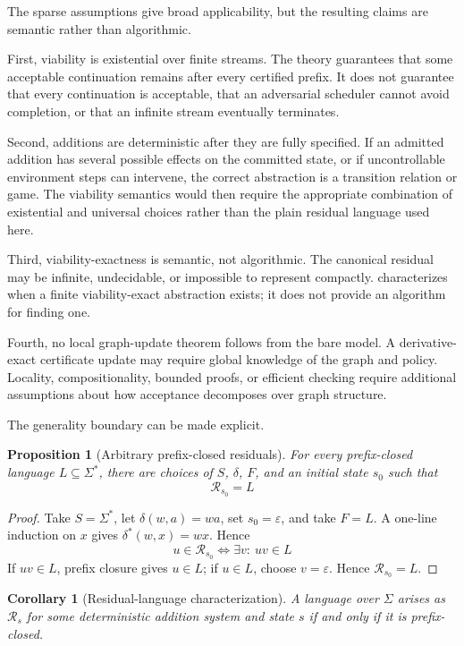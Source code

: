 \documentclass[11pt]{article}
\newtheorem{proposition}[proposition]{Proposition}
\newtheorem{corollary}[corollary]{Corollary}
\theoremstyle{definition}
\newcommand{\States}{S}
\newcommand{\Additions}{\Sigma}
\newcommand{\Accept}{F}
\newcommand{\Run}{\delta^{*}}
\newcommand{\Residual}{\mathcal R}
\newcommand{\eps}{\varepsilon}
\begin{document}
The sparse assumptions give broad applicability, but the resulting claims are semantic rather than algorithmic.

First, viability is existential over finite streams. The theory guarantees that some acceptable continuation remains after every certified prefix. It does not guarantee that every continuation is acceptable, that an adversarial scheduler cannot avoid completion, or that an infinite stream eventually terminates.

Second, additions are deterministic after they are fully specified. If an admitted addition has several possible effects on the committed state, or if uncontrollable environment steps can intervene, the correct abstraction is a transition relation or game. The viability semantics would then require the appropriate combination of existential and universal choices rather than the plain residual language used here.

Third, viability-exactness is semantic, not algorithmic. The canonical residual may be infinite, undecidable, or impossible to represent compactly.  characterizes when a finite viability-exact abstraction exists; it does not provide an algorithm for finding one.

Fourth, no local graph-update theorem follows from the bare model. A derivative-exact certificate update may require global knowledge of the graph and policy. Locality, compositionality, bounded proofs, or efficient checking require additional assumptions about how acceptance decomposes over graph structure.

The generality boundary can be made explicit.

\begin{proposition}[Arbitrary prefix-closed residuals]\label{prop:expressiveness}
For every prefix-closed language $L\subseteq\Additions^*$, there are choices of $\States$, $\delta$, $\Accept$, and an initial state $s_0$ such that
\[
  \Residual_{s_0}=L
\]
\end{proposition}

\begin{proof}
Take $\States=\Additions^*$, let $\delta(w,a)=wa$, set $s_0=\eps$, and take $\Accept=L$. A one-line induction on $x$ gives $\Run(w,x)=wx$. Hence
\[
 u\in\Residual_{s_0}
 \Longleftrightarrow
 \exists v:\ uv\in L
\]
If $uv\in L$, prefix closure gives $u\in L$; if $u\in L$, choose $v=\eps$. Hence $\Residual_{s_0}=L$.
\end{proof}

\begin{corollary}[Residual-language characterization]\label{cor:residual-language-characterization}
A language over $\Additions$ arises as $\Residual_s$ for some deterministic addition system and state $s$ if and only if it is prefix-closed.
\end{corollary}
\end{document}
